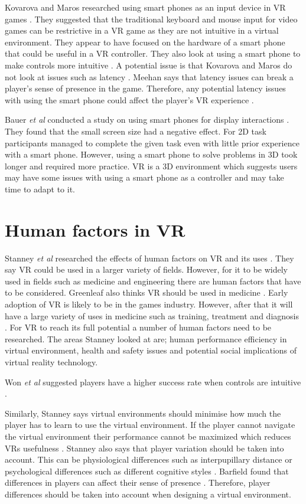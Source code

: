 \documentclass{scrartcl}
\begin{document}
Kovarova and Maros researched using smart phones as an input device in VR games \cite{Kovarova}. They suggested that the traditional keyboard and mouse input for video games can be restrictive in a VR game as they are not intuitive in a virtual environment. They appear to have focused on the hardware of a smart phone that could be useful in a VR controller. They also look at using a smart phone to make controls more intuitive \cite{Kovarova}.
A potential issue is that Kovarova and Maros do not look at issues such as latency .  Meehan says that latency issues can break a player's sense of presence in the game. Therefore, any potential latency issues with using the smart phone could affect the player's VR experience \cite{Meehan}.

Bauer \textit{et al} conducted a study on using smart phones for display interactions \cite{Bauer}. They found that the small screen size had a negative effect. For 2D task participants managed to complete the given task even with little prior experience with a smart phone. However, using a smart phone to solve problems in 3D took longer and required more practice. VR is a 3D environment which suggests users may have some issues with using a smart phone as a controller and may take time to adapt to it.

\section{Human factors in VR}
Stanney \textit{et al} researched the effects of human factors on VR and its uses \cite{stanney}.  They say VR could be used in a larger variety of fields. However, for it to be widely used in fields such as medicine and engineering there are human factors that have to be considered. Greenleaf also thinks VR should be used in medicine \cite{Greenleaf}. Early adoption of VR is likely to be in the games industry. However, after that it will have a large variety of uses in medicine such as training, treatment and diagnosis \cite{Greenleaf}.  For VR to reach its full potential a number of human factors need to be researched. The areas Stanney looked at are; human performance efficiency in virtual environment, health and safety issues and potential social implications of virtual reality technology. 

Won \textit{et al} suggested players have a higher success rate when controls are intuitive \cite{won2015homuncular}. 

Similarly, Stanney  says virtual environments should minimise how much the player has to learn to use the virtual environment. If the player cannot navigate the virtual environment their performance cannot be maximized which reduces VRs usefulness \cite{stanney}.  Stanney also says that player variation should be taken into account. This can be physiological differences such as interpupillary distance or psychological differences such as different cognitive styles \cite{stanney}. Barfield found that differences in players can affect their sense of presence \cite{barfield1993sense}. Therefore, player differences should be taken into account when designing a virtual environment.
\end{document}
